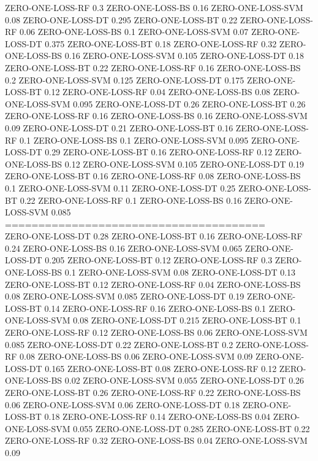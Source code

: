 \documentclass[12pt]{article}
\begin{document}
ZERO-ONE-LOSS-RF 0.3
ZERO-ONE-LOSS-BS 0.16
ZERO-ONE-LOSS-SVM 0.08
ZERO-ONE-LOSS-DT 0.295
ZERO-ONE-LOSS-BT 0.22
ZERO-ONE-LOSS-RF 0.06
ZERO-ONE-LOSS-BS 0.1
ZERO-ONE-LOSS-SVM 0.07
ZERO-ONE-LOSS-DT 0.375
ZERO-ONE-LOSS-BT 0.18
ZERO-ONE-LOSS-RF 0.32
ZERO-ONE-LOSS-BS 0.16
ZERO-ONE-LOSS-SVM 0.105
ZERO-ONE-LOSS-DT 0.18
ZERO-ONE-LOSS-BT 0.22
ZERO-ONE-LOSS-RF 0.16
ZERO-ONE-LOSS-BS 0.2
ZERO-ONE-LOSS-SVM 0.125
ZERO-ONE-LOSS-DT 0.175
ZERO-ONE-LOSS-BT 0.12
ZERO-ONE-LOSS-RF 0.04
ZERO-ONE-LOSS-BS 0.08
ZERO-ONE-LOSS-SVM 0.095
ZERO-ONE-LOSS-DT 0.26
ZERO-ONE-LOSS-BT 0.26
ZERO-ONE-LOSS-RF 0.16
ZERO-ONE-LOSS-BS 0.16
ZERO-ONE-LOSS-SVM 0.09
ZERO-ONE-LOSS-DT 0.21
ZERO-ONE-LOSS-BT 0.16
ZERO-ONE-LOSS-RF 0.1
ZERO-ONE-LOSS-BS 0.1
ZERO-ONE-LOSS-SVM 0.095
ZERO-ONE-LOSS-DT 0.29
ZERO-ONE-LOSS-BT 0.16
ZERO-ONE-LOSS-RF 0.12
ZERO-ONE-LOSS-BS 0.12
ZERO-ONE-LOSS-SVM 0.105
ZERO-ONE-LOSS-DT 0.19
ZERO-ONE-LOSS-BT 0.16
ZERO-ONE-LOSS-RF 0.08
ZERO-ONE-LOSS-BS 0.1
ZERO-ONE-LOSS-SVM 0.11
ZERO-ONE-LOSS-DT 0.25
ZERO-ONE-LOSS-BT 0.22
ZERO-ONE-LOSS-RF 0.1
ZERO-ONE-LOSS-BS 0.16
ZERO-ONE-LOSS-SVM 0.085\\
=======================================\\
ZERO-ONE-LOSS-DT 0.28
ZERO-ONE-LOSS-BT 0.16
ZERO-ONE-LOSS-RF 0.24
ZERO-ONE-LOSS-BS 0.16
ZERO-ONE-LOSS-SVM 0.065
ZERO-ONE-LOSS-DT 0.205
ZERO-ONE-LOSS-BT 0.12
ZERO-ONE-LOSS-RF 0.3
ZERO-ONE-LOSS-BS 0.1
ZERO-ONE-LOSS-SVM 0.08
ZERO-ONE-LOSS-DT 0.13
ZERO-ONE-LOSS-BT 0.12
ZERO-ONE-LOSS-RF 0.04
ZERO-ONE-LOSS-BS 0.08
ZERO-ONE-LOSS-SVM 0.085
ZERO-ONE-LOSS-DT 0.19
ZERO-ONE-LOSS-BT 0.14
ZERO-ONE-LOSS-RF 0.16
ZERO-ONE-LOSS-BS 0.1
ZERO-ONE-LOSS-SVM 0.08
ZERO-ONE-LOSS-DT 0.215
ZERO-ONE-LOSS-BT 0.1
ZERO-ONE-LOSS-RF 0.12
ZERO-ONE-LOSS-BS 0.06
ZERO-ONE-LOSS-SVM 0.085
ZERO-ONE-LOSS-DT 0.22
ZERO-ONE-LOSS-BT 0.2
ZERO-ONE-LOSS-RF 0.08
ZERO-ONE-LOSS-BS 0.06
ZERO-ONE-LOSS-SVM 0.09
ZERO-ONE-LOSS-DT 0.165
ZERO-ONE-LOSS-BT 0.08
ZERO-ONE-LOSS-RF 0.12
ZERO-ONE-LOSS-BS 0.02
ZERO-ONE-LOSS-SVM 0.055
ZERO-ONE-LOSS-DT 0.26
ZERO-ONE-LOSS-BT 0.26
ZERO-ONE-LOSS-RF 0.22
ZERO-ONE-LOSS-BS 0.06
ZERO-ONE-LOSS-SVM 0.06
ZERO-ONE-LOSS-DT 0.18
ZERO-ONE-LOSS-BT 0.18
ZERO-ONE-LOSS-RF 0.14
ZERO-ONE-LOSS-BS 0.04
ZERO-ONE-LOSS-SVM 0.055
ZERO-ONE-LOSS-DT 0.285
ZERO-ONE-LOSS-BT 0.22
ZERO-ONE-LOSS-RF 0.32
ZERO-ONE-LOSS-BS 0.04
ZERO-ONE-LOSS-SVM 0.09
\end{document}
